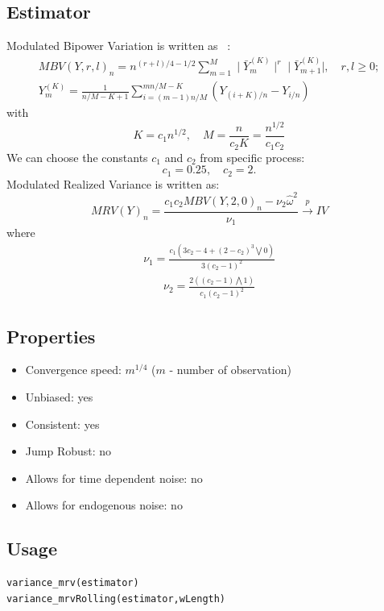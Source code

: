 \documentclass[letterpaper]{report}
\begin{document}
\subsection{Estimator}
Modulated Bipower Variation is written as ~\cite[Podolskij and Vetter, 2009]{Podolskij_Vetter}:
\begin{gather}
\label{MBV}
MBV(Y,r,l)_n = n^{(r+l)/4-1/2}\sum_{m=1}^M \mid \bar{Y}_m^{(K)}\mid^r \mid
\bar{Y}_{m+1}^{(K)}\mid, \quad r,l \geq 0;\\
Y_m^{(K)}=\frac{1}{n/M-K+1}\sum_{i=(m-1)n/M}^{mn/M-K}(Y_{(i+K)/n}-Y_{i/n})
\end{gather}
with
\begin{equation}
K=c_1 n^{1/2}, \quad M=\frac{n}{c_2K}=\frac{n^{1/2}}{c_1c_2}
\end{equation}
We can choose the constants $c_1$ and $c_2$ from specific process:
\begin{equation}
c_1 = 0.25, \quad
c_2 = 2.
\end{equation}
\noindent Modulated Realized Variance is written as:
\begin{equation}
MRV(Y)_n = \frac{c_1 c_2 MBV(Y,2,0)_n -\nu_2 \hat{\omega}^2}{\nu_1} \stackrel{p}{\to} IV
\end{equation}
where
\begin{gather}
\nu_1 = \frac{c_1(3c_2-4+(2-c_2)^3\bigvee 0)}{3(c_2-1)^2}
\end{gather}
\begin{gather}
\nu_2 = \frac{2((c_2-1)\bigwedge 1)}{c_1(c_2-1)^2}
\end{gather}
\subsection{Properties}
\begin{itemize}
\item Convergence speed: $m^{1/4}$ ($m$ - number of observation)
\item Unbiased: yes
\item Consistent: yes
\item Jump Robust: no
\item Allows for time dependent noise: no
\item Allows for endogenous noise: no
\end{itemize}
  \subsection{Usage}
\begin{lstlisting}
variance_mrv(estimator)
variance_mrvRolling(estimator,wLength)
\end{lstlisting}
\end{document}
